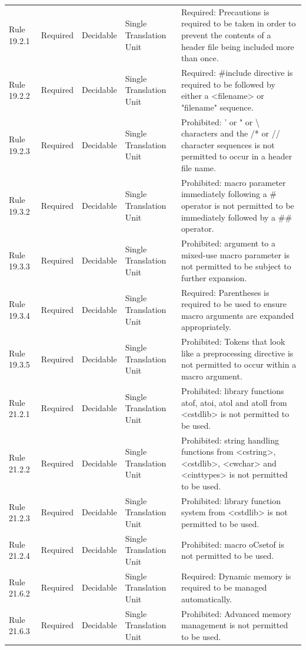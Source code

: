 \documentclass[11pt]{article}
\begin{document}
{\begin{longtable}{@{}P{2.2cm}P{1.7cm}P{2.1cm}P{3.0cm}P{6.7cm}@{}}
Rule 19.2.1 & Required & Decidable & Single Translation Unit & Required: Precautions is required to be taken in order to prevent the contents of a header file being included more than once. \\
Rule 19.2.2 & Required & Decidable & Single Translation Unit & Required: \#include directive is required to be followed by either a <filename> or "filename" sequence. \\
Rule 19.2.3 & Required & Decidable & Single Translation Unit & Prohibited: ' or " or \textbackslash{} characters and the /* or // character sequences is not permitted to occur in a header file name. \\
Rule 19.3.2 & Required & Decidable & Single Translation Unit & Prohibited: macro parameter immediately following a \# operator is not permitted to be immediately followed by a \#\# operator. \\
Rule 19.3.3 & Required & Decidable & Single Translation Unit & Prohibited: argument to a mixed-use macro parameter is not permitted to be subject to further expansion. \\
Rule 19.3.4 & Required & Decidable & Single Translation Unit & Required: Parentheses is required to be used to ensure macro arguments are expanded appropriately. \\
Rule 19.3.5 & Required & Decidable & Single Translation Unit & Prohibited: Tokens that look like a preprocessing directive is not permitted to occur within a macro argument. \\
Rule 21.2.1 & Required & Decidable & Single Translation Unit & Prohibited: library functions atof, atoi, atol and atoll from <cstdlib> is not permitted to be used. \\
Rule 21.2.2 & Required & Decidable & Single Translation Unit & Prohibited: string handling functions from <cstring>, <cstdlib>, <cwchar> and <cinttypes> is not permitted to be used. \\
Rule 21.2.3 & Required & Decidable & Single Translation Unit & Prohibited: library function system from <cstdlib> is not permitted to be used. \\
Rule 21.2.4 & Required & Decidable & Single Translation Unit & Prohibited: macro oCsetof is not permitted to be used. \\
Rule 21.6.2 & Required & Decidable & Single Translation Unit & Required: Dynamic memory is required to be managed automatically. \\
Rule 21.6.3 & Required & Decidable & Single Translation Unit & Prohibited: Advanced memory management is not permitted to be used. \\

\end{longtable}}
\end{document}
